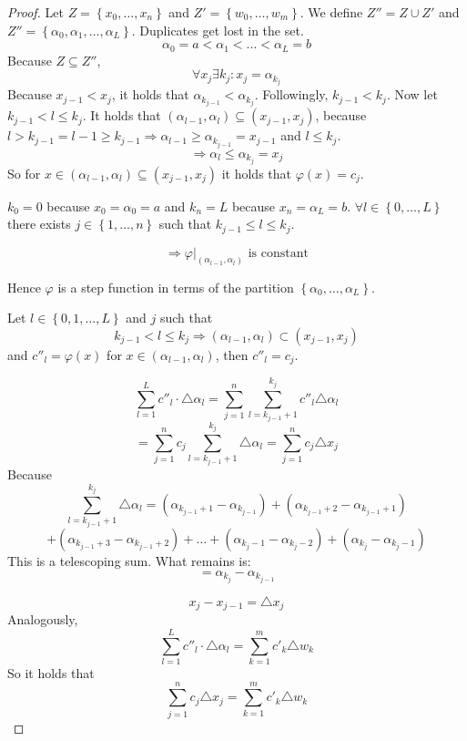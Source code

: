 \documentclass[a4paper,landscape,twocolumn]{article}
\theoremstyle{definition}
\newcommand\set[1]{\left\{#1\right\}}
\begin{document}
\begin{proof}
  Let $Z = \set{x_0, \ldots, x_n}$ and $Z' = \set{w_0,\ldots,w_m}$.
  We define $Z'' = Z \cup Z'$ and $Z'' = \set{\alpha_0, \alpha_1, \ldots, \alpha_L}$.
  Duplicates get lost in the set.
  \[ \alpha_0 = a < \alpha_1 < \ldots < \alpha_L = b \]
  Because $Z \subseteq Z''$,
  \[ \forall x_j \exists k_j: x_j = \alpha_{k_j} \]
  Because $x_{j-1} < x_j$, it holds that $\alpha_{k_{j-1}} < \alpha_{k_j}$.
  Followingly, $k_{j-1} < k_j$.
  Now let $k_{j-1} < l \leq k_j$.
  It holds that $(\alpha_{l-1}, \alpha_l) \subseteq (x_{j-1}, x_j)$,
  because $l > k_{j-1} = l-1 \geq k_{j-1} \Rightarrow \alpha_{l-1} \geq \alpha_{k_{j-1}} = x_{j-1}$
  and $l \leq k_j$.
  \[ \Rightarrow \alpha_l \leq \alpha_{k_j} = x_j \]
  So for $x \in (\alpha_{l-1}, \alpha_l) \subseteq (x_{j-1}, x_j)$ it holds that
  $\varphi(x) = c_j$.

  $k_0 = 0$ because $x_0 = \alpha_0 = a$ and $k_n = L$ because $x_n = \alpha_L = b$.
  $\forall l \in \set{0,\ldots,L}$ there exists $j \in \set{1,\ldots,n}$ such that
  $k_{j-1} \leq l \leq k_j$.

  \[ \Rightarrow \varphi|_{(\alpha_{l-1},\alpha_l)} \text{ is constant} \]

  Hence $\varphi$ is a step function in terms of the partition $\set{\alpha_0, \ldots, \alpha_L}$.

  Let $l \in \set{0,1,\ldots,L}$ and $j$ such that
  \[ k_{j-1} < l \leq k_j \Rightarrow (\alpha_{l-1},\alpha_l) \subset (x_{j-1},x_j) \]
  and $c''_l = \varphi(x)$ for $x \in (\alpha_{l-1},\alpha_l)$, then $c''_l = c_j$.

  \[ \sum_{l=1}^L c''_l \cdot \triangle \alpha_l = \sum_{j=1}^n \sum_{l=k_{j-1}+1}^{k_j} c''_l \triangle \alpha_l \]
  \[ = \sum_{j=1}^n c_j \sum_{l=k_{j-1}+1}^{k_j} \triangle \alpha_l = \sum_{j=1}^n c_j \triangle x_j \]
  Because
  \[
    \sum_{l=k_{j-1} + 1}^{k_j} \triangle \alpha_l
    = (\alpha_{k_{j-1}+1} - \alpha_{k_{j-1}}) + (\alpha_{k_{j-1}+2} - \alpha_{k_{j-1}+1})
  \] \[
    + (\alpha_{k_{j-1}+3} - \alpha_{k_{j-1}+2}) + \ldots + (\alpha_{k_j-1} - \alpha_{k_j-2}) + (\alpha_{k_j} - \alpha_{k_j-1})
  \]
  This is a telescoping sum. What remains is:
  \[ = \alpha_{k_j} - \alpha_{k_{j-1}} \]

  \[ x_j - x_{j-1} = \triangle x_j \]
  Analogously,
  \[ \sum_{l=1}^L c''_l \cdot \triangle \alpha_l = \sum_{k=1}^m c'_k \triangle w_k \]
  So it holds that
  \[ \sum_{j=1}^n c_j \triangle x_j = \sum_{k=1}^m c'_k \triangle w_k \]
\end{proof}
\end{document}
